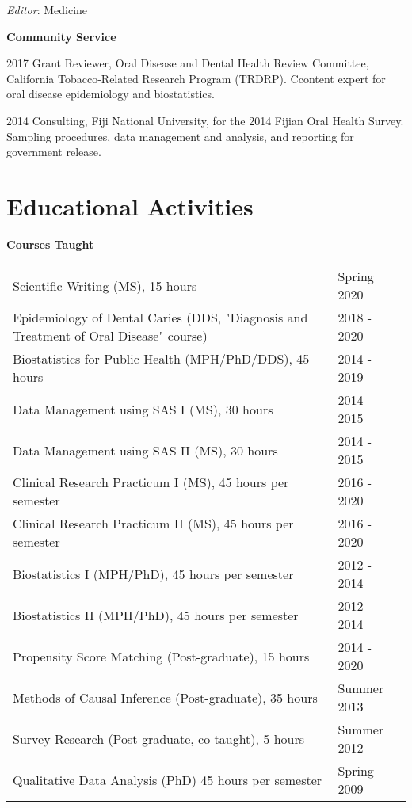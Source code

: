 \documentclass[margin,line]{res}
\begin{document}
\begin{resume}
\vspace*{-2.5mm}
{\em Editor}: Medicine



{\bf Community Service} \hfill 

\vspace*{-2.5mm}
2017 Grant Reviewer, Oral Disease and Dental Health Review Committee, California Tobacco-Related Research Program (TRDRP). Ccontent expert for oral disease epidemiology and biostatistics.

2014 Consulting, Fiji National University, for the 2014 Fijian Oral Health Survey. Sampling procedures, data management and analysis, and reporting for government release.


\section{\sc Educational Activities} 
{\bf Courses Taught} \hfill 

\vspace*{-2.5mm}

\begin{tabular}{@{}p{4.5in}p{2in}}
Scientific Writing (MS), 15 hours            & Spring 2020 \\            
Epidemiology of Dental Caries (DDS, "Diagnosis and Treatment of Oral Disease" course) & 2018 - 2020 \\	
Biostatistics for Public Health (MPH/PhD/DDS), 45 hours & 2014 - 2019 \\
Data Management using SAS I (MS), 30 hours & 2014 - 2015 \\
Data Management using SAS II (MS), 30 hours & 2014 - 2015 \\
Clinical Research Practicum I (MS), 45 hours per semester & 2016 - 2020 \\
Clinical Research Practicum II (MS), 45 hours per semester & 2016 - 2020 \\
Biostatistics I (MPH/PhD), 45 hours per semester & 2012 - 2014 \\	
Biostatistics II (MPH/PhD), 45 hours per semester & 2012 - 2014	\\
Propensity Score Matching (Post-graduate), 15 hours & 2014 - 2020 \\	
Methods of Causal Inference (Post-graduate), 35 hours & Summer 2013 \\
Survey Research (Post-graduate, co-taught), 5 hours & Summer 2012 \\
Qualitative Data Analysis (PhD) 45 hours per semester & Spring 2009 \\
\end{tabular}


\end{resume}
\end{document}
